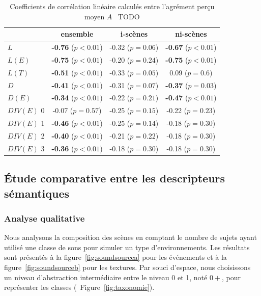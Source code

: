 \begin{table}[t]
\centering
\begin{tabular}{l c c c} 
            & ensemble                     & i-scènes                   & ni-scènes    \\
\hline
$L$         & \textbf{-0.76} ($p<0.01$)    & -0.32 ($p=0.06$)           & \textbf{-0.67} ($p<0.01$)\\
$L(E)$        & \textbf{-0.75} ($p<0.01$)    & -0.20 ($p=0.24$)           & \textbf{-0.75} ($p<0.01$)\\
$L(T)$        & \textbf{-0.51} ($p<0.01$)    & -0.33 ($p=0.05$)           &  0.09  ($p=0.6$) \\
$D$         & \textbf{-0.41} ($p<0.01$)    & -0.31 ($p=0.07$)           & \textbf{-0.37} ($p=0.03$)\\
$D(E)$        & \textbf{-0.34} ($p<0.01$)    & -0.22 ($p=0.21$)           & \textbf{-0.47} ($p<0.01$)\\
$DIV(E)$ 0     &          -0.07 ($p=0.57$)    & -0.25 ($p=0.15$)           & -0.22 ($p=0.23$)\\
$DIV(E)$ 1     & \textbf{-0.46} ($p<0.01$)    & -0.25 ($p=0.14$)           & -0.18 ($p=0.30$)\\
$DIV(E)$ 2     & \textbf{-0.40} ($p<0.01$)    & -0.21 ($p=0.22$)           & -0.18 ($p=0.30$)\\
$DIV(E)$ 3     & \textbf{-0.36} ($p<0.01$)    & -0.18 ($p=0.30$)           & -0.18 ($p=0.30$)\\
\hline
\end{tabular}
\vspace{0.5mm}
\caption{Coefficients de corrélation linéaire calculés entre l'agrément perçu moyen $A$ \vs~TODO}
\label{tab:corrStructA}
\end{table}

\subsection{Étude comparative entre les descripteurs sémantiques}

\subsubsection{Analyse qualitative}

Nous analysons la composition des scènes en comptant le nombre de sujets ayant utilisé une classe de sons pour simuler un type d'environnements. Les résultats sont présentés à la figure~\ref{fig:soundsourcea} pour les événements et à la figure~\ref{fig:soundsourceb} pour les textures. Par souci d'espace, nous choisissons un niveau d'abstraction intermédiaire entre le niveau 0 et 1, noté $0+$, pour représenter les classes (\cf~Figure~\ref{fig:taxonomie}).

